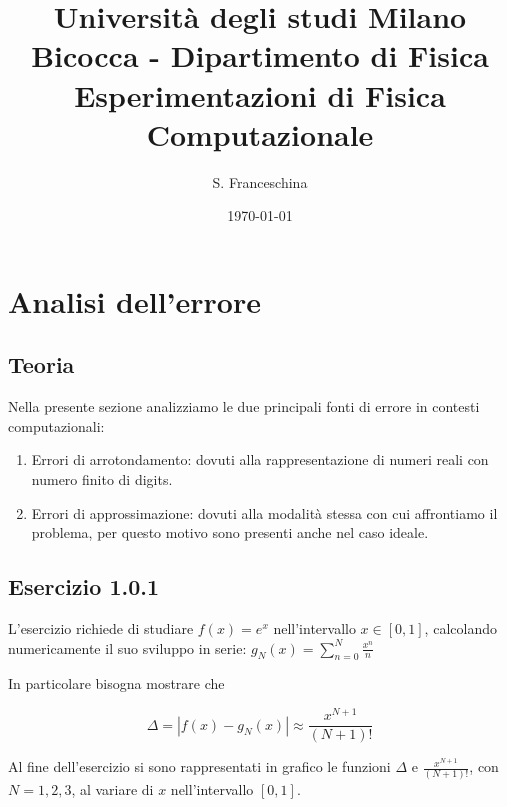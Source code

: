 \documentclass[letterpaper,12pt]{article}
\begin{document}
\title{{\small Università degli studi Milano Bicocca - Dipartimento di Fisica}\\
	Esperimentazioni di Fisica Computazionale}
\author{S. Franceschina}
\date{\today}
\maketitle
\thispagestyle{logoheader}

\begin{abstract} 
	\begin{adjustwidth}{-1cm}{-1cm}
	\end{adjustwidth}
\end{abstract}
\tableofcontents
\newpage

\section{Analisi dell'errore}
\subsection{Teoria}
Nella presente sezione analizziamo le due principali fonti di errore in contesti computazionali: 
\begin{enumerate}
    \item Errori di arrotondamento: dovuti alla rappresentazione di numeri reali con numero finito di digits.
    \item Errori di approssimazione: dovuti alla modalità stessa con cui affrontiamo il problema, 
          per questo motivo sono presenti anche nel caso ideale. 
\end{enumerate}

\subsection{Esercizio 1.0.1}
L'esercizio richiede di studiare $f(x)=e^x$ nell'intervallo $x\in [0,1]$, calcolando numericamente il suo sviluppo in 
serie: $g_N(x)=\sum_{n=0}^N \frac{x^n}{n}$

In particolare bisogna mostrare che
\begin{center}
\begin{equation}
    \Delta=|f(x)-g_N(x)| \approx \frac{x^{N+1}}{(N+1)!}
\end{equation}
\end{center}

Al fine dell'esercizio si sono rappresentati in grafico le funzioni $\Delta$ e $\frac{x^{N+1}}{(N+1)!}$, con 
$N=1,2,3$, al variare di $x$ nell'intervallo $[0,1]$. 
\end{document}
